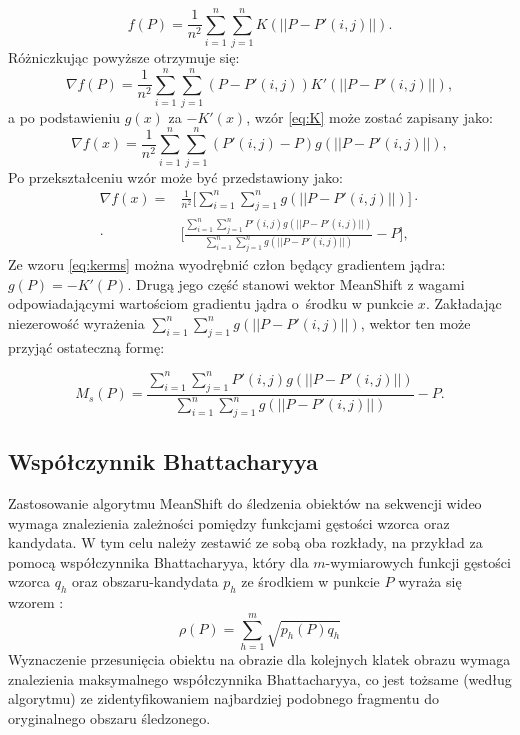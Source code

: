 \begin{equation}
f(P)=\frac{1}{n^2}\sum_{i=1}^{n}\sum_{j=1}^{n}K(||P-P'(i,j)||).
\end{equation}
Różniczkując powyższe otrzymuje się:
\begin{equation}
\label{eq:K}
\nabla f(P)=\frac{1}{n^2}\sum_{i=1}^{n}\sum_{j=1}^{n}(P-P'(i,j))K'(||P-P'(i,j)||),
\end{equation}
a po podstawieniu $g(x)$ za $-K'(x)$, wzór \eqref{eq:K} może zostać zapisany jako:
\begin{equation}
\nabla f(x)=\frac{1}{n^2}\sum_{i=1}^{n}\sum_{j=1}^{n}(P'(i,j)-P)g(||P-P'(i,j)||),
\end{equation}
Po przekształceniu wzór może być przedstawiony jako:
\begin{equation}
\label{eq:kerms}
\begin{aligned}
\nabla f(x)= &\frac{1}{n^2}\bigg[\sum_{i=1}^{n}\sum_{j=1}^{n}g(||P-P'(i,j)||)\bigg] \cdot\\ \cdot&\bigg[\frac{\sum_{i=1}^{n}\sum_{j=1}^{n}P'(i,j)g(||P-P'(i,j)||)}{\sum_{i=1}^{n}\sum_{j=1}^{n}g(||P-P'(i,j)||)} -P\bigg],
\end{aligned}
\end{equation}
Ze wzoru \eqref{eq:kerms} można wyodrębnić człon będący gradientem jądra: $g(P)=-K'(P)$. 
Drugą jego część stanowi wektor MeanShift z wagami odpowiadającymi wartościom gradientu jądra o~środku w punkcie $x$. 
Zakładając niezerowość wyrażenia $\sum_{i=1}^{n}\sum_{j=1}^{n}g(||P-P'(i,j)||)$, wektor ten może przyjąć ostateczną formę:

\begin{equation}
M_s(P)=\frac{\sum_{i=1}^{n}\sum_{j=1}^{n}P'(i,j)g(||P-P'(i,j)||)}{\sum_{i=1}^{n}\sum_{j=1}^{n}g(||P-P'(i,j)||)} -P.
\end{equation}

\subsection{Współczynnik Bhattacharyya}
 \label{ssec:Bhat}

Zastosowanie algorytmu MeanShift do śledzenia obiektów na sekwencji
wideo wymaga znalezienia zależności pomiędzy funkcjami gęstości wzorca oraz kandydata. 
W tym celu należy zestawić ze sobą oba rozkłady, na przykład za pomocą współczynnika Bhattacharyya, który dla $m$-wymiarowych funkcji gęstości wzorca $q_h$ oraz obszaru-kandydata $p_h$ ze środkiem w punkcie $P$ wyraża się wzorem \cite{Comaniciu}:
\begin{equation}
\label{eq:Bhat}
\rho(P)=\sum_{h=1}^{m}\sqrt{p_h(P)q_h}
\end{equation}
Wyznaczenie przesunięcia obiektu na obrazie dla kolejnych klatek obrazu wymaga znalezienia maksymalnego współczynnika Bhattacharyya, co jest tożsame (według algorytmu) ze zidentyfikowaniem najbardziej podobnego fragmentu do oryginalnego obszaru śledzonego.


